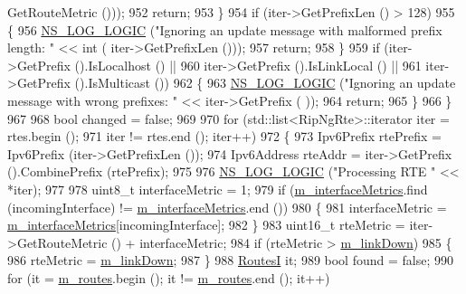 \begin{DoxyCode}
      GetRouteMetric ()));
952           \textcolor{keywordflow}{return};
953         \}
954       \textcolor{keywordflow}{if} (iter->GetPrefixLen () > 128)
955         \{
956           \hyperlink{group__logging_ga88acd260151caf2db9c0fc84997f45ce}{NS\_LOG\_LOGIC} (\textcolor{stringliteral}{"Ignoring an update message with malformed prefix length: "} << \textcolor{keywordtype}{int} (
      iter->GetPrefixLen ()));
957           \textcolor{keywordflow}{return};
958         \}
959       \textcolor{keywordflow}{if} (iter->GetPrefix ().IsLocalhost () ||
960           iter->GetPrefix ().IsLinkLocal () ||
961           iter->GetPrefix ().IsMulticast ())
962         \{
963           \hyperlink{group__logging_ga88acd260151caf2db9c0fc84997f45ce}{NS\_LOG\_LOGIC} (\textcolor{stringliteral}{"Ignoring an update message with wrong prefixes: "} << iter->GetPrefix (
      ));
964           \textcolor{keywordflow}{return};
965         \}
966     \}
967 
968   \textcolor{keywordtype}{bool} changed = \textcolor{keyword}{false};
969 
970   \textcolor{keywordflow}{for} (std::list<RipNgRte>::iterator iter = rtes.begin ();
971       iter != rtes.end (); iter++)
972     \{
973       Ipv6Prefix rtePrefix = Ipv6Prefix (iter->GetPrefixLen ());
974       Ipv6Address rteAddr = iter->GetPrefix ().CombinePrefix (rtePrefix);
975 
976       \hyperlink{group__logging_ga88acd260151caf2db9c0fc84997f45ce}{NS\_LOG\_LOGIC} (\textcolor{stringliteral}{"Processing RTE "} << *iter);
977 
978       uint8\_t interfaceMetric = 1;
979       \textcolor{keywordflow}{if} (\hyperlink{classns3_1_1RipNg_aa63ca4f7ad5ad13c878220c51d8b89c5}{m\_interfaceMetrics}.find (incomingInterface) != 
      \hyperlink{classns3_1_1RipNg_aa63ca4f7ad5ad13c878220c51d8b89c5}{m\_interfaceMetrics}.end ())
980         \{
981           interfaceMetric = \hyperlink{classns3_1_1RipNg_aa63ca4f7ad5ad13c878220c51d8b89c5}{m\_interfaceMetrics}[incomingInterface];
982         \}
983       uint16\_t rteMetric = iter->GetRouteMetric () + interfaceMetric;
984       \textcolor{keywordflow}{if} (rteMetric > \hyperlink{classns3_1_1RipNg_a6752c1bb1fc0909f0493033d426f2b92}{m\_linkDown})
985         \{
986           rteMetric = \hyperlink{classns3_1_1RipNg_a6752c1bb1fc0909f0493033d426f2b92}{m\_linkDown};
987         \}
988       \hyperlink{classns3_1_1RipNg_aa8bc6103d67089e1e3cd507936f94887}{RoutesI} it;
989       \textcolor{keywordtype}{bool} found = \textcolor{keyword}{false};
990       \textcolor{keywordflow}{for} (it = \hyperlink{classns3_1_1RipNg_acfc1011b140f9e612a8c27c9bfb4c6b5}{m\_routes}.begin (); it != \hyperlink{classns3_1_1RipNg_acfc1011b140f9e612a8c27c9bfb4c6b5}{m\_routes}.end (); it++)

\end{DoxyCode}
